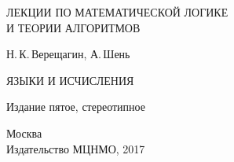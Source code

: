 \thispagestyle{empty}
\begin{center}
\large\sf
ЛЕКЦИИ ПО МАТЕМАТИЧЕСКОЙ ЛОГИКЕ\\   И ТЕОРИИ АЛГОРИТМОВ
\end{center}

\vspace*{28mm}

\begin{center}
\sf
Н.\,К.\,Верещагин, А.\,Шень
\end{center}

\vspace*{8mm}

\begin{center}
\sf
\LARGE
ЯЗЫКИ И ИСЧИСЛЕНИЯ
\end{center}

\vspace*{1mm}

\begin{center}
\sf
Издание пятое, стереотипное
\end{center}

\vfill

\begin{center}
\sf
Москва\\
Издательство МЦНМО, 2017
\end{center}

\clearpage
